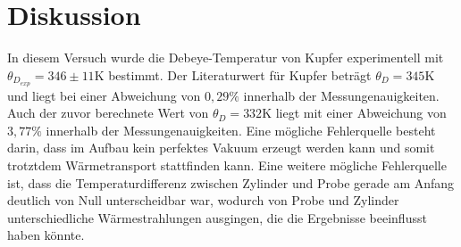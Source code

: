 \section{Diskussion}
In diesem Versuch wurde die Debeye-Temperatur von Kupfer experimentell mit \\$\theta_{D_{exp}} = 346 \pm 11 \si{\kelvin}$ bestimmt.
Der Literaturwert für Kupfer beträgt  $\theta_{D} = 345 \si{\kelvin}$ und liegt bei einer Abweichung von $0{,}29 \%$ innerhalb der Messungenauigkeiten.
Auch der zuvor berechnete Wert von $\theta_{D} = 332 \si{\kelvin}$ liegt mit einer Abweichung von $3{,}77\%$ innerhalb der Messungenauigkeiten.
Eine mögliche Fehlerquelle besteht darin, dass im Aufbau kein perfektes Vakuum erzeugt werden kann und somit trotztdem Wärmetransport stattfinden kann.
Eine weitere mögliche Fehlerquelle ist, dass die Temperaturdifferenz zwischen Zylinder und Probe gerade am Anfang deutlich von Null unterscheidbar war, wodurch von Probe und Zylinder unterschiedliche Wärmestrahlungen ausgingen, die die Ergebnisse beeinflusst haben könnte.
